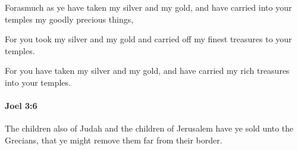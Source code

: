 			\begin{versebox}
					\item[BHS] 
					\item[LXX] 
					\item[ASV] Forasmuch as ye have taken my silver and my gold, and have carried into your temples my goodly precious things,
					\item[NIV] For you took my silver and my gold and carried off my finest treasures to your temples.
					\item[NRSV] For you have taken my silver and my gold, and have carried my rich treasures into your temples.
			\end{versebox}

		\paragraph{Joel 3:6} %
			\label{JOEL-3-6}

			The children also of Judah and the children of Jerusalem have ye sold unto the Grecians, that ye might remove them far from their border.

